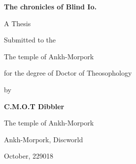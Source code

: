 \begin{titlepage}
	\centering
	\vfill
	{\huge\bfseries The chronicles of Blind Io. \par}
	\vspace{2cm}
	{\Large A Thesis\par}
	\vfill
	Submitted to the\par
	{\Large The temple of Ankh-Morpork\par
	for the degree of Doctor of Theosophology\par}
	\vspace{1cm}
	by\par
	\vspace{0.5cm}
	{\Large \bfseries C.M.O.T Dibbler\par}
	\vfill
	
	{\large The temple of Ankh-Morpork\par
		Ankh-Morpork, Discworld\par}
	{October, 229018}
\end{titlepage}